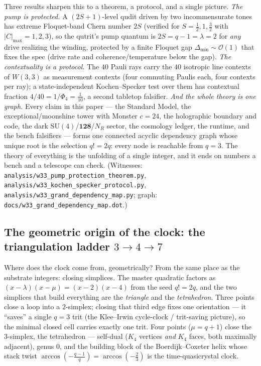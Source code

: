\documentclass[11pt]{article}
\begin{document}
Three results sharpen this to a theorem, a protocol, and a single picture.
\emph{The pump is protected.} A $(2S{+}1)$-level qudit driven by two incommensurate
tones has extreme Floquet-band Chern number $2S$ (verified for $S=\tfrac12,1,\tfrac32$
with $|C|_{\max}=1,2,3$), so the qutrit's pump quantum is $2S=q-1=\lambda=2$ for
\emph{any} drive realizing the winding, protected by a finite Floquet gap
$\Delta_{\min}\sim\mathcal O(1)$ that fixes the spec (drive rate and
coherence/temperature below the gap). \emph{The contextuality is a protocol.} The
$40$ Pauli rays carry the $40$ isotropic line contexts of $W(3,3)$ as measurement
contexts (four commuting Paulis each, four contexts per ray); a state-independent
Kochen--Specker test over them has contextual fraction $4/40=1/\Phi_4=\tfrac1{10}$,
a second tabletop falsifier. \emph{And the whole theory is one graph.} Every claim
in this paper --- the Standard Model, the exceptional/moonshine tower with Monster
$c=24$, the holographic boundary and code, the dark $\mathrm{SU}(4)$/$\mathbf{128}$/$N_R$
sector, the cosmology ledger, the runtime, and the bench falsifiers --- forms one
connected acyclic dependency graph whose unique root is the selection $q!=2q$:
every node is reachable from $q=3$. The theory of everything is the unfolding of a
single integer, and it ends on numbers a bench and a telescope can check.
(Witnesses: \texttt{analysis/w33\_pump\_protection\_theorem.py},
\texttt{analysis/w33\_kochen\_specker\_protocol.py},
\texttt{analysis/w33\_grand\_dependency\_map.py};
graph: \texttt{docs/w33\_grand\_dependency\_map.dot}.)

\subsection{The geometric origin of the clock: the triangulation ladder
$3\to4\to7$}
\label{sec:triangulation-ladder}

Where does the clock come from, geometrically? From the same place as the
substrate integers: closing simplices. The master quadratic factors as
$(x-\lambda)(x-\mu)=(x-2)(x-4)$ from the seed $q!=2q$, and the two simplices that
build everything are the \emph{triangle} and the \emph{tetrahedron}. Three points
close a loop into a $2$-simplex; closing that third edge fixes one orientation ---
it ``saves'' a single $q=3$ trit (the Klee--Irwin cycle-clock / trit-saving
picture), so the minimal closed cell carries exactly one trit. Four points
($\mu=q+1$) close the $3$-simplex, the tetrahedron --- self-dual ($K_4$ vertices
\emph{and} $K_4$ faces, both maximally adjacent), genus $0$, and the building block
of the Boerdijk--Coxeter helix whose stack twist $\arccos(-\tfrac{q-1}{q})=\arccos(-\tfrac23)$
is the time-quasicrystal clock.
\end{document}
